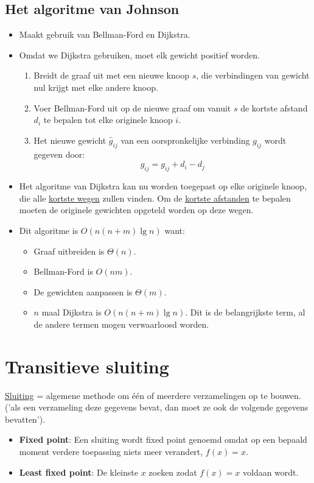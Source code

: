 \subsection{Het algoritme van Johnson}
\begin{itemize}
	\item Maakt gebruik van Bellman-Ford en Dijkstra.
	\item Omdat we Dijkstra gebruiken, moet elk gewicht positief worden. 
	\begin{enumerate}
		\item Breidt de graaf uit met een nieuwe knoop $s$, die verbindingen van gewicht nul krijgt met elke andere knoop.
		\item Voer Bellman-Ford uit op de nieuwe graaf om vanuit $s$ de kortste afstand $d_i$ te bepalen tot elke originele knoop $i$.
		\item Het nieuwe gewicht $\hat{g}_{ij}$ van een oorspronkelijke verbinding $g_{ij}$ wordt gegeven door: 
		$$\hat{g}_{ij} = g_{ij} + d_i - d_j$$ 
	\end{enumerate}
	\item Het algoritme van Dijkstra kan nu worden toegepast op elke originele knoop, die alle \underline{kortste wegen} zullen vinden. Om de \underline{kortste afstanden} te bepalen moeten de originele gewichten opgeteld worden op deze wegen.
	\item Dit algoritme is $O(n(n + m)\lg n)$ want:
	\begin{itemize}
		\item Graaf uitbreiden is $\Theta(n)$.
		\item Bellman-Ford is $O(nm)$.
		\item De gewichten aanpassen is $\Theta(m)$.
		\item $n$ maal Dijkstra is $O(n(n + m)\lg n)$. Dit is de belangrijkste term, al de andere termen mogen verwaarloosd worden.
	\end{itemize}
\end{itemize}

\section{Transitieve sluiting}
\underline{Sluiting} = algemene methode om één of meerdere verzamelingen op te bouwen. ('als een verzameling deze gegevens bevat, dan moet ze ook de volgende gegevens bevatten').

\begin{itemize}
	\item \textbf{Fixed point}:  Een sluiting wordt fixed point genoemd omdat op een bepaald moment verdere toepassing niets meer verandert, $f(x) = x$.
	\item \textbf{Least fixed point}: De kleinste $x$ zoeken zodat $f(x) = x$ voldaan wordt.
\end{itemize}

